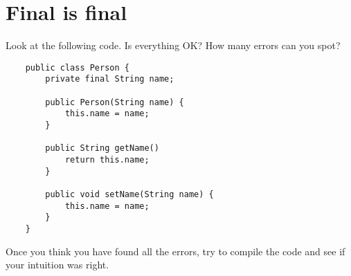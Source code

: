 \documentclass{article}
\begin{document}
\section{Final is final}
\label{sec:final-final}

Look at the following code. Is everything OK? How many errors can you spot?

\begin{verbatim}
    public class Person {
        private final String name;

        public Person(String name) {
            this.name = name;
        }

        public String getName()
            return this.name;
        }

        public void setName(String name) {
            this.name = name;
        }
    }
\end{verbatim}

Once you think you have found all the errors, try to compile the code
and see if your intuition was right. 
\end{document}
